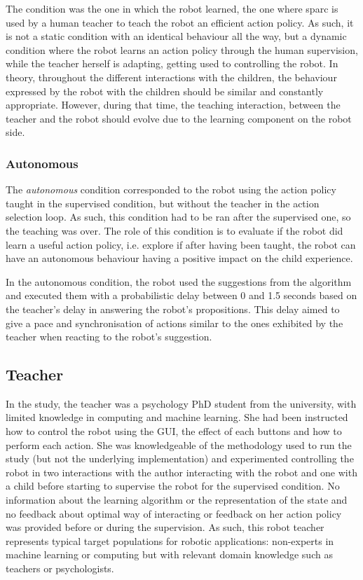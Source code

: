 The  condition was the one in which the robot learned, the one where \gls{sparc} is used by a human teacher to teach the robot an efficient action policy. As such, it is not a static condition with an identical behaviour all the way, but a dynamic condition where the robot learns an action policy through the human supervision, while the teacher herself is adapting, getting used to controlling the robot. In theory, throughout the different interactions with the children, the behaviour expressed by the robot with the children should be similar and constantly appropriate. However, during that time, the teaching interaction, between the teacher and the robot should evolve due to the learning component on the robot side. 

\subsubsection{Autonomous}

The \textit{autonomous} condition corresponded to the robot using the action policy taught in the supervised condition, but without the teacher in the action selection loop. As such, this condition had to be ran after the supervised one, so the teaching was over. The role of this condition is to evaluate if the robot did learn a useful action policy, i.e. explore if after having been taught, the robot can have an autonomous behaviour having a positive impact on the child experience.

In the autonomous condition, the robot used the suggestions from the algorithm and executed them with a probabilistic delay between 0 and 1.5 seconds based on the teacher's delay in answering the robot's propositions. This delay aimed to give a pace and synchronisation of actions similar to the ones exhibited by the teacher when reacting to the robot's suggestion.

\subsection{Teacher}
In the study, the teacher was a psychology PhD student from the university, with limited knowledge in computing and machine learning. She had been instructed how to control the robot using the GUI, the effect of each buttons and how to perform each action. She was knowledgeable of the methodology used to run the study (but not the underlying implementation) and experimented controlling the robot in two interactions with the author interacting with the robot and one with a child before starting to supervise the robot for the supervised condition. No information about the learning algorithm or the representation of the state and no feedback about optimal way of interacting or feedback on her action policy was provided before or during the supervision. As such, this robot teacher represents typical target populations for robotic applications: non-experts in machine learning or computing but with relevant domain knowledge such as teachers or psychologists.

